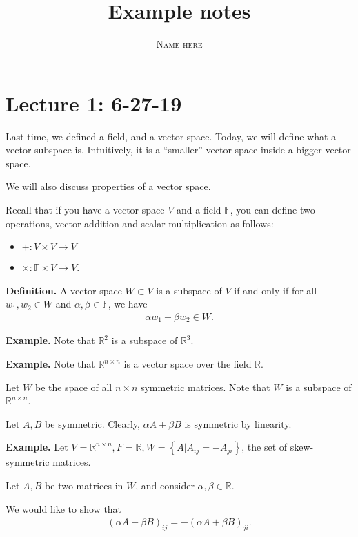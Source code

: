 \documentclass{article}
\title{Example notes}
\author{\textsc{Name here}}
\begin{document}
\maketitle

\tableofcontents

\section{Lecture 1: 6-27-19}

Last time, we defined a field, and a vector space.  Today, we will define what a vector subspace is.  Intuitively, it is a ``smaller'' vector space inside a bigger vector space.

We will also discuss properties of a vector space.

Recall that if you have a vector space $V$ and a field $\mathbb{F}$, you can define two operations, vector addition and scalar multiplication as follows:

\begin{itemize}
  \item $+ : V \times V \to V$
  \item $\times: \mathbb{F} \times V \to V$.
\end{itemize}

{\bf Definition.} A vector space $W \subset V$ is a subspace of $V$ if and only if for all $w_1, w_2 \in W$ and $\alpha, \beta \in \mathbb{F}$, we have
\begin{align*}
  \alpha w_1 + \beta w_2 \in W.
\end{align*}

{\bf Example.} Note that $\mathbb{R}^2$ is a subspace of $\mathbb{R}^3$.

{\bf Example.} Note that $\mathbb{R}^{n \times n}$ is a vector space over the field $\mathbb{R}$.

Let $W$ be the space of all $n \times n$ symmetric matrices.  Note that $W$ is a subspace of $\mathbb{R}^{n \times n}$.

Let $A, B$ be symmetric.  Clearly, $\alpha A + \beta B$ is symmetric by linearity.

{\bf Example.} Let $V = \mathbb{R}^{n \times n}, F = \mathbb{R}, W = \left\{ A | A_{ij} = - A_{ji} \right\}$, the set of skew-symmetric matrices.

Let $A, B$ be two matrices in $W$, and consider $\alpha, \beta \in \mathbb{R}$.

We would like to show that
\begin{align*}
  (\alpha A + \beta B)_{ij} = - (\alpha A + \beta B)_{ji}.
\end{align*}
\end{document}
